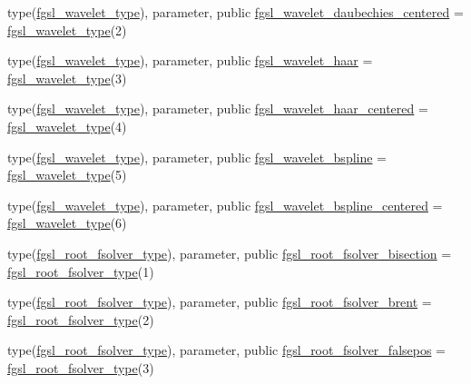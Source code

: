 \begin{DoxyCompactItemize}
\item 
type(\hyperlink{structfgsl_1_1fgsl__wavelet__type}{fgsl\+\_\+wavelet\+\_\+type}), parameter, public \hyperlink{namespacefgsl_a26df4eaadbaa474bae2dca6abdaea27f}{fgsl\+\_\+wavelet\+\_\+daubechies\+\_\+centered} = \hyperlink{structfgsl_1_1fgsl__wavelet__type}{fgsl\+\_\+wavelet\+\_\+type}(2)
\item 
type(\hyperlink{structfgsl_1_1fgsl__wavelet__type}{fgsl\+\_\+wavelet\+\_\+type}), parameter, public \hyperlink{namespacefgsl_a416323050493f1845d764b5bf3599477}{fgsl\+\_\+wavelet\+\_\+haar} = \hyperlink{structfgsl_1_1fgsl__wavelet__type}{fgsl\+\_\+wavelet\+\_\+type}(3)
\item 
type(\hyperlink{structfgsl_1_1fgsl__wavelet__type}{fgsl\+\_\+wavelet\+\_\+type}), parameter, public \hyperlink{namespacefgsl_a98a440f78f036ed2b35f84992ba0db82}{fgsl\+\_\+wavelet\+\_\+haar\+\_\+centered} = \hyperlink{structfgsl_1_1fgsl__wavelet__type}{fgsl\+\_\+wavelet\+\_\+type}(4)
\item 
type(\hyperlink{structfgsl_1_1fgsl__wavelet__type}{fgsl\+\_\+wavelet\+\_\+type}), parameter, public \hyperlink{namespacefgsl_a6fb8d8501c5f52d65dd32be21f7a8431}{fgsl\+\_\+wavelet\+\_\+bspline} = \hyperlink{structfgsl_1_1fgsl__wavelet__type}{fgsl\+\_\+wavelet\+\_\+type}(5)
\item 
type(\hyperlink{structfgsl_1_1fgsl__wavelet__type}{fgsl\+\_\+wavelet\+\_\+type}), parameter, public \hyperlink{namespacefgsl_a61c7f4e05d439d135784a3d84e7f9b3a}{fgsl\+\_\+wavelet\+\_\+bspline\+\_\+centered} = \hyperlink{structfgsl_1_1fgsl__wavelet__type}{fgsl\+\_\+wavelet\+\_\+type}(6)
\item 
type(\hyperlink{structfgsl_1_1fgsl__root__fsolver__type}{fgsl\+\_\+root\+\_\+fsolver\+\_\+type}), parameter, public \hyperlink{namespacefgsl_aa7dc27fd2c5eda5bdd57f4936c041faf}{fgsl\+\_\+root\+\_\+fsolver\+\_\+bisection} = \hyperlink{structfgsl_1_1fgsl__root__fsolver__type}{fgsl\+\_\+root\+\_\+fsolver\+\_\+type}(1)
\item 
type(\hyperlink{structfgsl_1_1fgsl__root__fsolver__type}{fgsl\+\_\+root\+\_\+fsolver\+\_\+type}), parameter, public \hyperlink{namespacefgsl_a097401e95907837ed18233ae594898d2}{fgsl\+\_\+root\+\_\+fsolver\+\_\+brent} = \hyperlink{structfgsl_1_1fgsl__root__fsolver__type}{fgsl\+\_\+root\+\_\+fsolver\+\_\+type}(2)
\item 
type(\hyperlink{structfgsl_1_1fgsl__root__fsolver__type}{fgsl\+\_\+root\+\_\+fsolver\+\_\+type}), parameter, public \hyperlink{namespacefgsl_ac71356c84267ed5e1dba5501be28b428}{fgsl\+\_\+root\+\_\+fsolver\+\_\+falsepos} = \hyperlink{structfgsl_1_1fgsl__root__fsolver__type}{fgsl\+\_\+root\+\_\+fsolver\+\_\+type}(3)

\end{DoxyCompactItemize}
